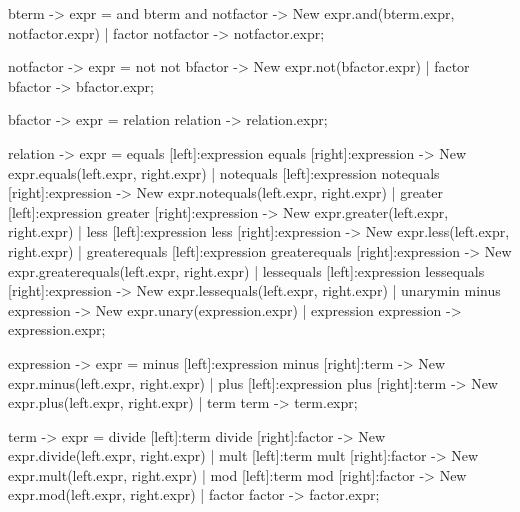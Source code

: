     bterm       {-> expr}   =   {and} bterm and notfactor                               {-> New expr.and(bterm.expr, notfactor.expr)}
                            |   {factor} notfactor                                      {-> notfactor.expr};

    notfactor   {-> expr}   =   {not} not bfactor                                       {-> New expr.not(bfactor.expr)}
                            |   {factor} bfactor                                        {-> bfactor.expr};

    bfactor     {-> expr}   =   {relation} relation                                     {-> relation.expr};

    relation    {-> expr}   =   {equals} [left]:expression equals [right]:expression                {-> New expr.equals(left.expr, right.expr)}
                            |   {notequals} [left]:expression notequals [right]:expression          {-> New expr.notequals(left.expr, right.expr)}
                            |   {greater} [left]:expression greater [right]:expression              {-> New expr.greater(left.expr, right.expr)}
                            |   {less} [left]:expression less [right]:expression                    {-> New expr.less(left.expr, right.expr)}
                            |   {greaterequals} [left]:expression greaterequals [right]:expression  {-> New expr.greaterequals(left.expr, right.expr)}
                            |   {lessequals} [left]:expression lessequals [right]:expression        {-> New expr.lessequals(left.expr, right.expr)}
                            |   {unarymin} minus expression                                         {-> New expr.unary(expression.expr)}
                            |   {expression} expression                                             {-> expression.expr};

    expression  {-> expr}   =   {minus} [left]:expression minus [right]:term            {-> New expr.minus(left.expr, right.expr)}
                            |   {plus} [left]:expression plus [right]:term              {-> New expr.plus(left.expr, right.expr)}
                            |   {term} term                                             {-> term.expr};

    term        {-> expr}   =   {divide} [left]:term divide [right]:factor              {-> New expr.divide(left.expr, right.expr)}
                            |   {mult} [left]:term mult [right]:factor                  {-> New expr.mult(left.expr, right.expr)}
                            |   {mod} [left]:term mod [right]:factor                    {-> New expr.mod(left.expr, right.expr)}
                            |   {factor} factor                                         {-> factor.expr};

